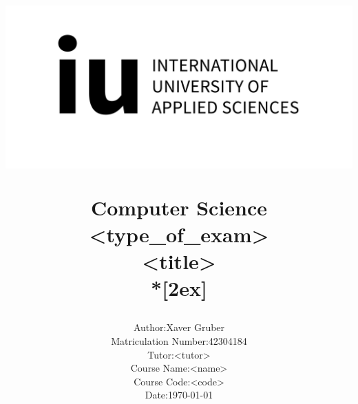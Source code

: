 \begin{titlepage}

  \title{ \centerline{\includegraphics[scale=.6,]{Bilder/iuLogo.png}} 
    {\Large
      Computer Science\\
      \textless type\_of\_exam\textgreater \\
    }
     \vspace{45pt}
      \textless title\textgreater\\*[2ex] 

  }
	\author{\begin{tabular}{ll}
          	Author: & Xaver Gruber \\ Matriculation Number: & 42304184 \\
            Tutor: & \textless tutor\textgreater \\
            Course Name: & \textless name\textgreater \\
            Course Code: & \textless code\textgreater \\
            Date: & \today \\
          \end{tabular}}

  \date{}

  \maketitle
\end{titlepage}
